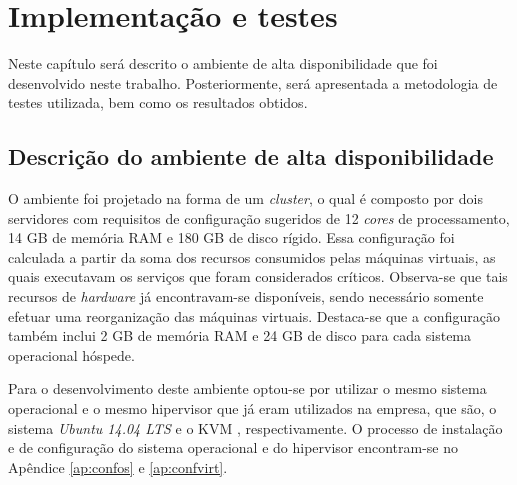 \chapter{Implementação e testes}
\label{cap:implementacaoresultados}

Neste capítulo será descrito o ambiente de alta disponibilidade que foi desenvolvido neste trabalho. Posteriormente, será apresentada a 
metodologia de testes utilizada, bem como os resultados obtidos.

\section{Descrição do ambiente de alta disponibilidade}
\label{section:implementacao}


O ambiente foi projetado na forma de um \textit{cluster}, o qual é composto por dois servidores com requisitos de configuração sugeridos
de 12 \textit{cores} de processamento, 14 GB de memória \ac{RAM} e 180 GB de disco rígido.
Essa configuração foi calculada a partir da soma dos recursos consumidos pelas máquinas virtuais, as quais executavam os serviços que foram 
considerados críticos. Observa-se que tais recursos de \textit{hardware} já encontravam-se disponíveis, sendo necessário somente efetuar uma 
reorganização das máquinas virtuais. Destaca-se que a configuração também inclui 2 GB de memória \ac{RAM} e 24 GB de disco para cada sistema 
operacional hóspede.

Para o desenvolvimento deste ambiente optou-se por utilizar o mesmo sistema operacional e o mesmo hipervisor que já eram utilizados na empresa, 
que são, o sistema \textit{Ubuntu 14.04 \ac{LTS}} e o \ac{KVM} \cite{kvm}, respectivamente. O processo de instalação e de configuração do sistema 
operacional e do hipervisor encontram-se no Apêndice \ref{ap:confos} e \ref{ap:confvirt}.


